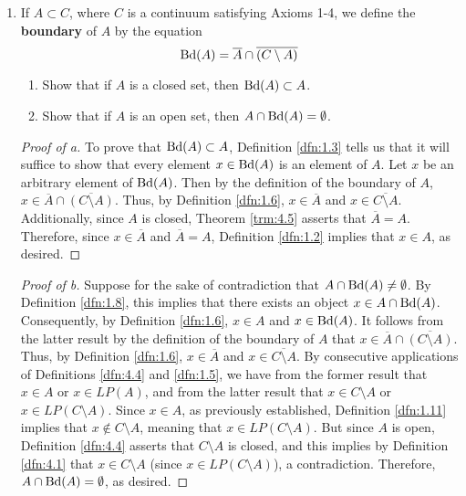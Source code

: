 \documentclass[../main.tex]{subfiles}
\begin{document}
\begin{enumerate}
    \item If $A\subset C$, where $C$ is a continuum satisfying Axioms 1-4, we define the \textbf{boundary} of $A$ by the equation
    \begin{equation*}
        \operatorname{Bd}(A) = \overline{A}\cap\overline{(C\setminus A)}
    \end{equation*}
    \begin{enumerate}
        \item Show that if $A$ is a closed set, then $\operatorname{Bd}(A)\subset A$.
        \item Show that if $A$ is an open set, then $A\cap\operatorname{Bd}(A)=\emptyset$.
    \end{enumerate}
    \begin{proof}[Proof of a]
        To prove that $\operatorname{Bd}(A)\subset A$, Definition \ref{dfn:1.3} tells us that it will suffice to show that every element $x\in\operatorname{Bd}(A)$ is an element of $A$. Let $x$ be an arbitrary element of $\operatorname{Bd}(A)$. Then by the definition of the boundary of $A$, $x\in\overline{A}\cap\overline{(C\setminus A)}$. Thus, by Definition \ref{dfn:1.6}, $x\in\overline{A}$ and $x\in\overline{C\setminus A}$. Additionally, since $A$ is closed, Theorem \ref{trm:4.5} asserts that $\overline{A}=A$. Therefore, since $x\in\overline{A}$ and $\overline{A}=A$, Definition \ref{dfn:1.2} implies that $x\in A$, as desired.
    \end{proof}
    \begin{proof}[Proof of b]
        Suppose for the sake of contradiction that $A\cap\operatorname{Bd}(A)\neq\emptyset$. By Definition \ref{dfn:1.8}, this implies that there exists an object $x\in A\cap\operatorname{Bd}(A)$. Consequently, by Definition \ref{dfn:1.6}, $x\in A$ and $x\in\operatorname{Bd}(A)$. It follows from the latter result by the definition of the boundary of $A$ that $x\in\overline{A}\cap\overline{(C\setminus A)}$. Thus, by Definition \ref{dfn:1.6}, $x\in\overline{A}$ and $x\in\overline{C\setminus A}$. By consecutive applications of Definitions \ref{dfn:4.4} and \ref{dfn:1.5}, we have from the former result that $x\in A$ or $x\in LP(A)$, and from the latter result that $x\in C\setminus A$ or $x\in LP(C\setminus A)$. Since $x\in A$, as previously established, Definition \ref{dfn:1.11} implies that $x\notin C\setminus A$, meaning that $x\in LP(C\setminus A)$. But since $A$ is open, Definition \ref{dfn:4.4} asserts that $C\setminus A$ is closed, and this implies by Definition \ref{dfn:4.1} that $x\in C\setminus A$ (since $x\in LP(C\setminus A)$), a contradiction. Therefore, $A\cap\operatorname{Bd}(A)=\emptyset$, as desired.
    \end{proof}
\end{enumerate}
\end{document}
